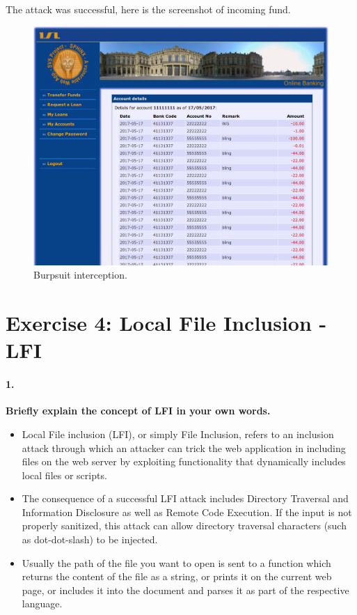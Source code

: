 \documentclass[12pt]{report}
\begin{document}
	The attack was successful, here is the screenshot of incoming fund.
	
	\begin{figure}[H]
		\includegraphics[width=0.75\textheight,height=0.5\textheight]{images/3_3moneycomes.jpg}
		\caption{Burpsuit interception.}
		
	\end{figure}
	\newpage
	
	\section*{Exercise 4: Local File Inclusion - LFI}
	\paragraph*{1.}{\bf Briefly explain the concept of LFI in your own words.}\\
	\begin{itemize}
		\item Local File inclusion (LFI), or simply File Inclusion, refers to an inclusion attack through which an attacker can trick the web application in including files on the web server by exploiting functionality that dynamically includes local files or scripts.
		\item The consequence of a successful LFI attack includes Directory Traversal and Information Disclosure as well as Remote Code Execution. If the input is not properly sanitized, this attack can allow directory traversal characters (such as dot-dot-slash) to be injected.
		\item Usually the path of the file you want to open is sent to a function which returns the content of the file as a string, or prints it on the current web page, or includes it into the document and parses it as part of the respective language.
	\end{itemize}
\end{document}

